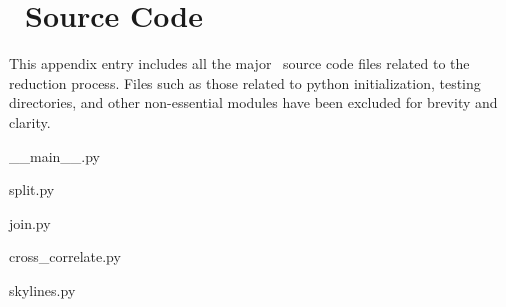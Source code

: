 \chapter{\stops\ Source Code} \label{app:code}
\lstset{inputpath=/media/justin/Transcend/STOPS/}

This appendix entry includes all the major \stops\ source code files related to the reduction process. Files such as those related to python initialization, testing directories, and other non-essential modules have been excluded for brevity and clarity.


{__main__.py}
\clearpage


{split.py}
\clearpage


{join.py}
\clearpage


{cross_correlate.py}
\clearpage


{skylines.py}
